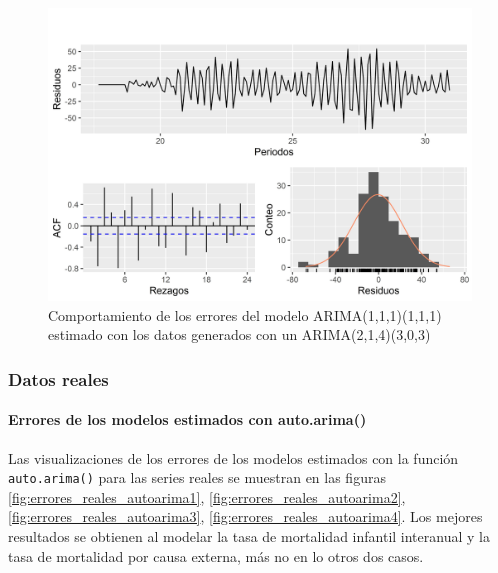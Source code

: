 \documentclass[
]{article}
\begin{document}
\begin{figure}[H]
\includegraphics[width=1\linewidth,height=1\textheight]{Tesis_files/figure-latex/errores_simulados_arima_estandar6-1} \caption{Comportamiento de los errores del modelo ARIMA(1,1,1)(1,1,1) estimado con los datos generados con un ARIMA(2,1,4)(3,0,3)}\label{fig:errores_simulados_arima_estandar6}
\end{figure}

\subsubsection{Datos reales}

\paragraph{Errores de los modelos estimados con auto.arima()}

Las visualizaciones de los errores de los modelos estimados con la
función \texttt{auto.arima()} para las series reales se muestran en las
figuras \ref{fig:errores_reales_autoarima1},
\ref{fig:errores_reales_autoarima2},
\ref{fig:errores_reales_autoarima3},
\ref{fig:errores_reales_autoarima4}. Los mejores resultados se obtienen
al modelar la tasa de mortalidad infantil interanual y la tasa de
mortalidad por causa externa, más no en lo otros dos casos.
\end{document}
